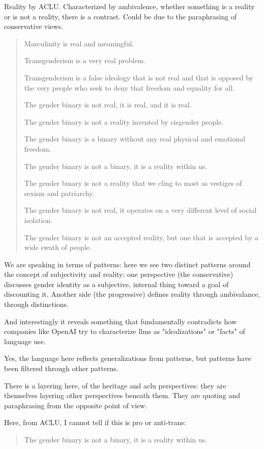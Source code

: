 \documentclass[11pt]{article}
\begin{document}
Reality by ACLU. Characterized by ambivalence, whether something is a
reality or is not a reality, there is a contrast. Could be due to the
paraphrasing of conservative views. 

\begin{quote}
Masculinity is real and meaningful.

Transgenderism is a very real problem.

Transgenderism is a false ideology that is not real and that is
opposed by the very people who seek to deny that freedom and equality
for all.

The gender binary is not real, it is real, and it is real.

The gender binary is not a reality invented by cisgender people.

The gender binary is a binary without any real physical and emotional
freedom.

The gender binary is not a binary, it is a reality within us.

The gender binary is not a reality that we cling to most as vestiges
of sexism and patriarchy.

The gender binary is not real, it operates on a very different level
of social isolation.

The gender binary is not an accepted reality, but one that is accepted
by a wide swath of people.
\end{quote}

We are speaking in terms of patterns: here we see two distinct
patterns around the concept of subjectivity and reality: one
perspective (the conservative) discusses gender identity as a
subjective, internal thing toward a goal of discounting it. Another
side (the progressive) defines reality through ambivalance, through
distinctions. 

And interestingly it reveals something that fundamentally contradicts
how companies like OpenAI try to characterize llms as "idealizations"
or "facts" of language use. 

Yes, the language here reflects generalizations from patterns, but
patterns have been filtered through other patterns.

There is a layering here, of the heritage and aclu perspectives: they
are themselves layering other perspectives beneath them. They are
quoting and paraphrasing from the opposite point of view.

Here, from ACLU, I cannot tell if this is pro or anti-trans:

\begin{quote}


The gender binary is not a binary, it is a reality within us.
\end{quote}
\end{document}
